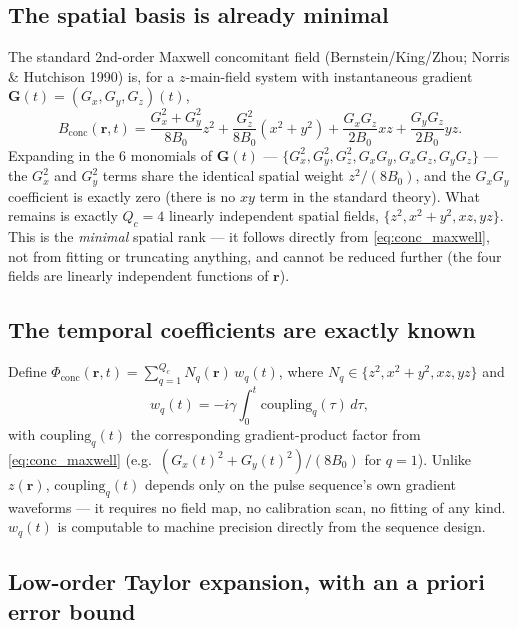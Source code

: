 \documentclass{article}
\begin{document}
\subsection{The spatial basis is already minimal}

The standard 2nd-order Maxwell concomitant field (Bernstein/King/Zhou; Norris \& Hutchison 1990)
is, for a $z$-main-field system with instantaneous gradient $\mathbf{G}(t)=(G_x,G_y,G_z)(t)$,
\begin{equation}
    B_{\mathrm{conc}}(\mathbf{r},t) = \frac{G_x^2+G_y^2}{8B_0}z^2
        + \frac{G_z^2}{8B_0}(x^2+y^2) + \frac{G_xG_z}{2B_0}xz + \frac{G_yG_z}{2B_0}yz.
    \label{eq:conc_maxwell}
\end{equation}
Expanding in the 6 monomials of $\mathbf{G}(t)$ — $\{G_x^2,G_y^2,G_z^2,G_xG_y,G_xG_z,G_yG_z\}$ —
the $G_x^2$ and $G_y^2$ terms share the identical spatial weight $z^2/(8B_0)$, and the $G_xG_y$
coefficient is exactly zero (there is no $xy$ term in the standard theory). What remains is
exactly $Q_c=4$ linearly independent spatial fields, $\{z^2, x^2+y^2, xz, yz\}$. This is the
\emph{minimal} spatial rank — it follows directly from \eqref{eq:conc_maxwell}, not from fitting
or truncating anything, and cannot be reduced further (the four fields are linearly independent
functions of $\mathbf{r}$).

\subsection{The temporal coefficients are exactly known}

Define $\Phi_{\mathrm{conc}}(\mathbf{r},t) = \sum_{q=1}^{Q_c} N_q(\mathbf{r})\,w_q(t)$, where
$N_q\in\{z^2,x^2+y^2,xz,yz\}$ and
\begin{equation}
    w_q(t) = -i\gamma\int_0^t \mathrm{coupling}_q(\tau)\,d\tau,
\end{equation}
with $\mathrm{coupling}_q(t)$ the corresponding gradient-product factor from
\eqref{eq:conc_maxwell} (e.g.\ $(G_x(t)^2+G_y(t)^2)/(8B_0)$ for $q{=}1$). Unlike $z(\mathbf{r})$,
$\mathrm{coupling}_q(t)$ depends only on the pulse sequence's own gradient waveforms — it requires
no field map, no calibration scan, no fitting of any kind. $w_q(t)$ is computable to machine
precision directly from the sequence design.

\subsection{Low-order Taylor expansion, with an a priori error bound}
\end{document}
